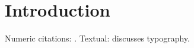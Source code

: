 \documentclass{article}
\begin{document}
\section{Introduction}
Numeric citations: \parencite{knuth1984, lamport1994}.
Textual: \textcite{knuth1984} discusses typography.

\printbibliography
\end{document}
